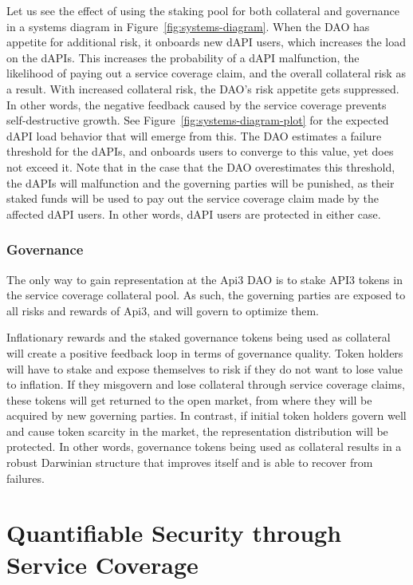 \documentclass[11pt]{article}
\begin{document}
Let us see the effect of using the staking pool for both collateral and governance in a systems diagram in Figure~\ref{fig:systems-diagram}.
When the DAO has appetite for additional risk, it onboards new dAPI users, which increases the load on the dAPIs.
This increases the probability of a dAPI malfunction, the likelihood of paying out a service coverage claim, and the overall collateral risk as a result.
With increased collateral risk, the DAO’s risk appetite gets suppressed.
In other words, the negative feedback caused by the service coverage prevents self-destructive growth.
See Figure~\ref{fig:systems-diagram-plot} for the expected dAPI load behavior that will emerge from this.
The DAO estimates a failure threshold for the dAPIs, and onboards users to converge to this value, yet does not exceed it.
Note that in the case that the DAO overestimates this threshold, the dAPIs will malfunction and the governing parties will be punished, as their staked funds will be used to pay out the service coverage claim made by the affected dAPI users.
In other words, dAPI users are protected in either case.

\subsubsection{Governance}
\label{sec:governance}

The only way to gain representation at the Api3 DAO is to stake API3 tokens in the service coverage collateral pool.
As such, the governing parties are exposed to all risks and rewards of Api3, and will govern to optimize them.

Inflationary rewards and the staked governance tokens being used as collateral will create a positive feedback loop in terms of governance quality.
Token holders will have to stake and expose themselves to risk if they do not want to lose value to inflation.
If they misgovern and lose collateral through service coverage claims, these tokens will get returned to the open market, from where they will be acquired by new governing parties.
In contrast, if initial token holders govern well and cause token scarcity in the market, the representation distribution will be protected.
In other words, governance tokens being used as collateral results in a robust Darwinian structure that improves itself and is able to recover from failures.


\section{Quantifiable Security through Service Coverage}
\label{sec:quantifiable-security-through-service-coverage}
\end{document}
